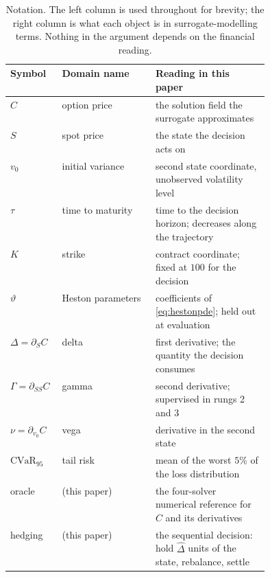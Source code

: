 \documentclass{article}
\begin{document}
\begin{table}[!htbp]
\caption{Notation. The left column is used throughout for brevity; the right column
is what each object is in surrogate-modelling terms. Nothing in the argument depends
on the financial reading.}
\label{tab:notation}
\centering\footnotesize\setlength{\tabcolsep}{5pt}
\begin{tabular}{@{}llp{0.44\linewidth}@{}}
\toprule
Symbol & Domain name & Reading in this paper \\
\midrule
$C$ & option price & the solution field the surrogate approximates \\
$S$ & spot price & the state the decision acts on \\
$v_0$ & initial variance & second state coordinate, unobserved volatility level \\
$\tau$ & time to maturity & time to the decision horizon; decreases along the trajectory \\
$K$ & strike & contract coordinate; fixed at $100$ for the decision \\
$\vartheta$ & Heston parameters & coefficients of \eqref{eq:hestonpde}; held out at evaluation \\
$\Delta=\partial_S C$ & delta & first derivative; the quantity the decision consumes \\
$\Gamma=\partial_{SS}C$ & gamma & second derivative; supervised in rungs 2 and 3 \\
$\nu=\partial_{v_0}C$ & vega & derivative in the second state \\
$\mathrm{CVaR}_{95}$ & tail risk & mean of the worst $5\%$ of the loss distribution \\
oracle & (this paper) & the four-solver numerical reference for $C$ and its derivatives \\
hedging & (this paper) & the sequential decision: hold $\hat{\Delta}$ units of the state, rebalance, settle \\
\bottomrule
\end{tabular}
\end{table}
\end{document}
